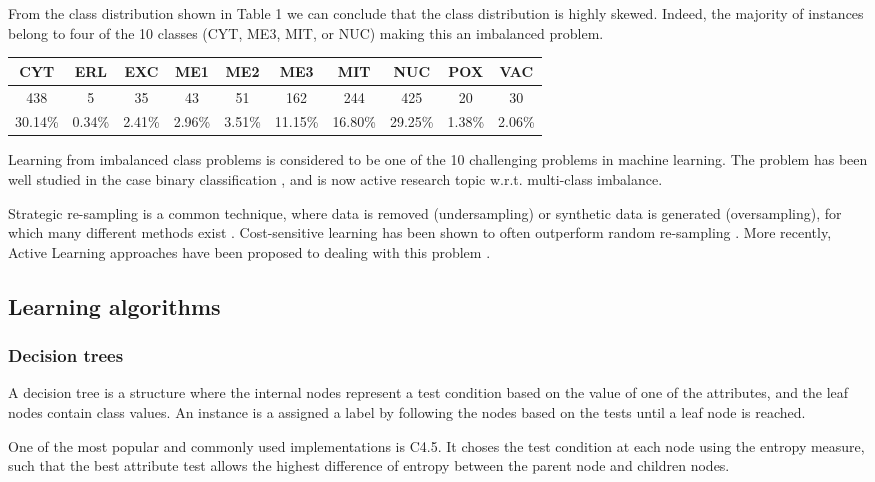 \documentclass{article}
\begin{document}
From the class distribution shown in Table 1 we can conclude that the class distribution is highly skewed. Indeed, the majority of instances belong to four of the 10 classes (CYT, ME3, MIT, or NUC) making this an imbalanced problem.

\begin{table}[ht]
\centering
\begin{tabular}{cccccccccc}
  \hline
CYT & ERL & EXC & ME1 & ME2 & ME3 & MIT & NUC & POX & VAC \\  
  \hline
  438 & 5 & 35 & 43 & 51 & 162 & 244 & 425 & 20 & 30 \\
  30.14\% &  0.34\% &  2.41\% &  2.96\% &  3.51\% & 11.15\% & 16.80\% & 29.25\% &  1.38\% &  2.06\% \\ 
\end{tabular}
\end{table}

Learning from imbalanced class problems is considered to be one of the 10 challenging problems in machine learning\cite{yang200610}. The problem has been well studied in the case binary classification \cite{kotsiantis2006handling}, and is now active research topic w.r.t. multi-class imbalance\cite{wang2012multiclass}.

Strategic re-sampling is a common technique, where data is removed (undersampling) or synthetic data is generated (oversampling), for which many different methods exist \cite{chawla2011smote}.
Cost-sensitive learning has been shown to often outperform random re-sampling \cite{japkowicz2002class}. More recently, Active Learning approaches have been proposed to dealing with this problem \cite{ertekin2007learning, hospedales2013finding}.

\subsection{Learning algorithms}

\subsubsection{Decision trees}

 A decision tree is a structure where the internal nodes represent a test condition based on the value of one of the attributes, and the leaf nodes contain class values\cite{mitchell1997machine}. An instance is a assigned a label by following the nodes based on the tests until a leaf node is reached.
 
One of the most popular and commonly used implementations is C4.5\cite{quinlan1993c4}. It choses the test condition at each node using the entropy measure, such that the best attribute test allows the highest difference of entropy between the parent node and children nodes.
\end{document}
